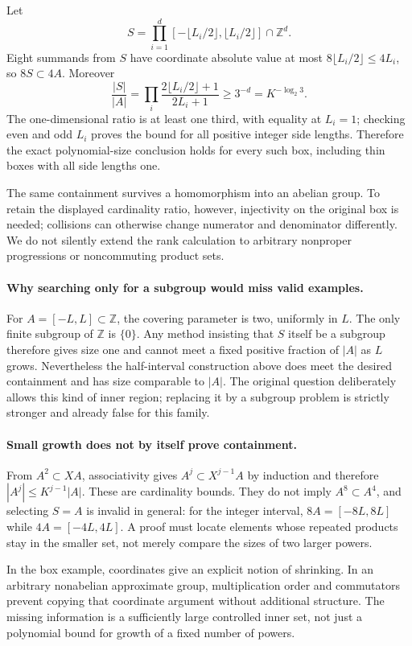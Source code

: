 \documentclass[11pt,a4paper]{article}
\newcommand{\Z}{\mathbb{Z}}
\begin{document}
Let
\[
 S=\prod_{i=1}^d[-\lfloor L_i/2\rfloor,\lfloor L_i/2\rfloor]\cap\Z^d.
\]
Eight summands from $S$ have coordinate absolute value at most $8\lfloor L_i/2\rfloor\leq4L_i$, so $8S\subset4A$. Moreover
\[
 \frac{|S|}{|A|}=
 \prod_i\frac{2\lfloor L_i/2\rfloor+1}{2L_i+1}
 \geq3^{-d}=K^{-\log_2 3}.
\]
The one-dimensional ratio is at least one third, with equality at $L_i=1$; checking even and odd $L_i$ proves the bound for all positive integer side lengths. Therefore the exact polynomial-size conclusion holds for every such box, including thin boxes with all side lengths one.

The same containment survives a homomorphism into an abelian group. To retain the displayed cardinality ratio, however, injectivity on the original box is needed; collisions can otherwise change numerator and denominator differently. We do not silently extend the rank calculation to arbitrary nonproper progressions or noncommuting product sets.

\paragraph{Why searching only for a subgroup would miss valid examples.}
For $A=[-L,L]\subset\Z$, the covering parameter is two, uniformly in $L$. The only finite subgroup of $\Z$ is $\{0\}$. Any method insisting that $S$ itself be a subgroup therefore gives size one and cannot meet a fixed positive fraction of $|A|$ as $L$ grows. Nevertheless the half-interval construction above does meet the desired containment and has size comparable to $|A|$. The original question deliberately allows this kind of inner region; replacing it by a subgroup problem is strictly stronger and already false for this family.

\paragraph{Small growth does not by itself prove containment.}
From $A^2\subset XA$, associativity gives $A^j\subset X^{j-1}A$ by induction and therefore $|A^j|\leq K^{j-1}|A|$. These are cardinality bounds. They do not imply $A^8\subset A^4$, and selecting $S=A$ is invalid in general: for the integer interval, $8A=[-8L,8L]$ while $4A=[-4L,4L]$. A proof must locate elements whose repeated products stay in the smaller set, not merely compare the sizes of two larger powers.

In the box example, coordinates give an explicit notion of shrinking. In an arbitrary nonabelian approximate group, multiplication order and commutators prevent copying that coordinate argument without additional structure. The missing information is a sufficiently large controlled inner set, not just a polynomial bound for growth of a fixed number of powers.
\end{document}
